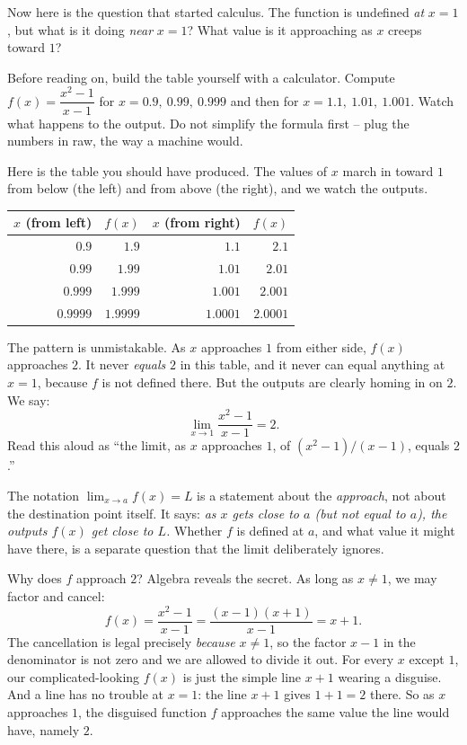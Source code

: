 Now here is the question that started calculus. The function is undefined \emph{at} $x = 1$,
but what is it doing \emph{near} $x = 1$? What value is it approaching as $x$ creeps toward
$1$?

\begin{labbox}
Before reading on, build the table yourself with a calculator. Compute $f(x) = \dfrac{x^2-1}{x-1}$
for $x = 0.9,\ 0.99,\ 0.999$ and then for $x = 1.1,\ 1.01,\ 1.001$. Watch what happens to the
output. Do not simplify the formula first -- plug the numbers in raw, the way a machine would.
\end{labbox}

Here is the table you should have produced. The values of $x$ march in toward $1$ from below
(the left) and from above (the right), and we watch the outputs.

\begin{center}
\begin{tabular}{rr@{\qquad}rr}
\toprule
$x$ (from left) & $f(x)$ & $x$ (from right) & $f(x)$ \\
\midrule
$0.9$    & $1.9$    & $1.1$    & $2.1$ \\
$0.99$   & $1.99$   & $1.01$   & $2.01$ \\
$0.999$  & $1.999$  & $1.001$  & $2.001$ \\
$0.9999$ & $1.9999$ & $1.0001$ & $2.0001$ \\
\bottomrule
\end{tabular}
\end{center}

The pattern is unmistakable. As $x$ approaches $1$ from either side, $f(x)$ approaches $2$. It
never \emph{equals} $2$ in this table, and it never can equal anything at $x=1$, because $f$ is
not defined there. But the outputs are clearly homing in on $2$. We say:
\[
  \lim_{x \to 1} \frac{x^2 - 1}{x - 1} = 2.
\]
Read this aloud as ``the limit, as $x$ approaches $1$, of $(x^2-1)/(x-1)$, equals $2$.''

\begin{focusbox}
The notation $\displaystyle\lim_{x\to a} f(x) = L$ is a statement about the \emph{approach},
not about the destination point itself. It says: \emph{as $x$ gets close to $a$ (but not equal
to $a$), the outputs $f(x)$ get close to $L$.} Whether $f$ is defined at $a$, and what value it
might have there, is a separate question that the limit deliberately ignores.
\end{focusbox}

Why does $f$ approach $2$? Algebra reveals the secret. As long as $x \neq 1$, we may factor and
cancel:
\[
  f(x) = \frac{x^2 - 1}{x - 1} = \frac{(x-1)(x+1)}{x - 1} = x + 1.
\]
The cancellation is legal precisely \emph{because} $x \neq 1$, so the factor $x - 1$ in the
denominator is not zero and we are allowed to divide it out. For every $x$ except $1$, our
complicated-looking $f(x)$ is just the simple line $x + 1$ wearing a disguise. And a line has
no trouble at $x = 1$: the line $x + 1$ gives $1 + 1 = 2$ there. So as $x$ approaches $1$, the
disguised function $f$ approaches the same value the line would have, namely $2$.

